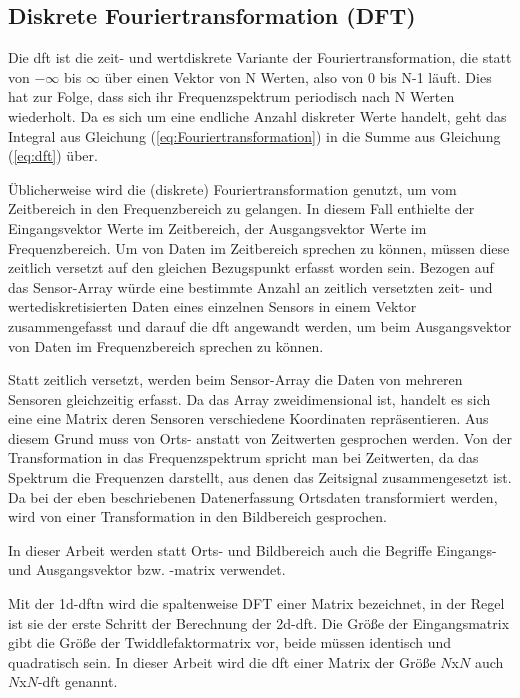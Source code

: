 \subsection{Diskrete Fouriertransformation (DFT)}\label{sec:dft}

Die \gls{dft} ist die zeit- und wertdiskrete Variante der Fouriertransformation, die statt von $-\infty$ bis $\infty$ über einen Vektor von N Werten, also von 0 bis N-1 läuft. 
Dies hat zur Folge, dass sich ihr Frequenzspektrum periodisch nach N Werten wiederholt.
Da es sich um eine endliche Anzahl diskreter Werte handelt, geht das Integral aus Gleichung (\ref{eq:Fouriertransformation}) in die Summe aus Gleichung (\ref{eq:dft}) über. 


Üblicherweise wird die (diskrete) Fouriertransformation genutzt, um vom Zeitbereich in den Frequenzbereich zu gelangen. In diesem Fall enthielte der Eingangsvektor 
Werte im Zeitbereich, der Ausgangsvektor Werte im Frequenzbereich.
Um von Daten im Zeitbereich sprechen zu können, müssen diese zeitlich versetzt auf den gleichen Bezugspunkt erfasst worden sein. 
Bezogen auf das Sensor-Array würde eine bestimmte Anzahl an zeitlich versetzten zeit- und wertediskretisierten Daten eines einzelnen Sensors in einem Vektor zusammengefasst 
und darauf die \gls{dft} angewandt werden, um beim Ausgangsvektor von Daten im Frequenzbereich sprechen zu können.

Statt zeitlich versetzt, werden beim Sensor-Array die Daten von mehreren Sensoren gleichzeitig erfasst. Da das Array zweidimensional ist, handelt es sich eine eine Matrix deren Sensoren verschiedene Koordinaten repräsentieren.
Aus diesem Grund muss von Orts- anstatt von
Zeitwerten gesprochen werden. Von der Transformation in das Frequenzspektrum spricht man bei Zeitwerten, da das Spektrum die Frequenzen darstellt, aus denen das Zeitsignal 
zusammengesetzt ist. Da bei der eben beschriebenen Datenerfassung Ortsdaten transformiert werden, wird von einer Transformation in den Bildbereich gesprochen. 

In dieser Arbeit werden statt Orts- und Bildbereich auch die Begriffe Eingangs- und Ausgangsvektor bzw. -matrix verwendet.

Mit der \gls{1d-dftn} wird die spaltenweise DFT einer Matrix bezeichnet, in der Regel ist sie der erste Schritt der Berechnung der \gls{2d-dft}. 
Die Größe der Eingangsmatrix gibt die Größe der Twiddlefaktormatrix vor, beide müssen identisch und
quadratisch sein. In dieser Arbeit wird die \gls{dft} einer Matrix der Größe $N$x$N$ auch $N$x$N$-\gls{dft} genannt.


